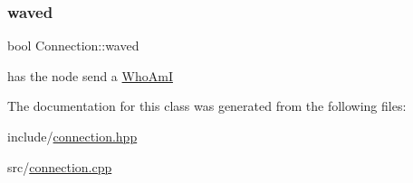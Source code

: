 \mbox{\label{classConnection_ac8ec569c3d8e883446c1498d6b0fa425}} 
\subsubsection{\texorpdfstring{waved}{waved}}
{\footnotesize\ttfamily bool Connection\+::waved\hspace{0.3cm}{\ttfamily [private]}}



has the node send a \mbox{\hyperlink{classWhoAmI}{Who\+AmI}} 



The documentation for this class was generated from the following files\+:\begin{DoxyCompactItemize}
\item 
include/\mbox{\hyperlink{connection_8hpp}{connection.\+hpp}}\item 
src/\mbox{\hyperlink{connection_8cpp}{connection.\+cpp}}\end{DoxyCompactItemize}
